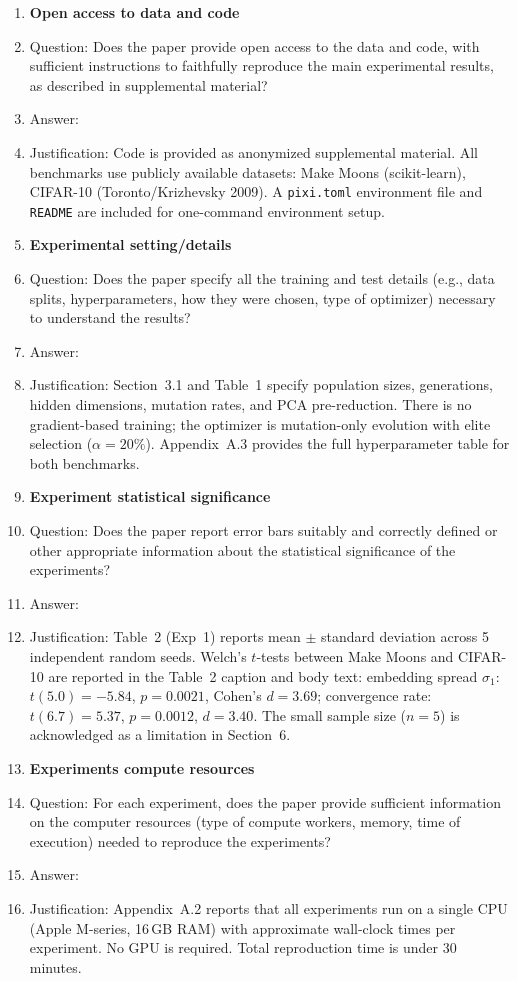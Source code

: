 \begin{enumerate}
\item {\bf Open access to data and code}
    \item[] Question: Does the paper provide open access to the data and code, with sufficient instructions to faithfully reproduce the main experimental results, as described in supplemental material?
    \item[] Answer: \answerYes{}
    \item[] Justification: Code is provided as anonymized supplemental material. All benchmarks use publicly available datasets: Make Moons (scikit-learn), CIFAR-10 (Toronto/Krizhevsky 2009). A \texttt{pixi.toml} environment file and \texttt{README} are included for one-command environment setup.

\item {\bf Experimental setting/details}
    \item[] Question: Does the paper specify all the training and test details (e.g., data splits, hyperparameters, how they were chosen, type of optimizer) necessary to understand the results?
    \item[] Answer: \answerYes{}
    \item[] Justification: Section~3.1 and Table~1 specify population sizes, generations, hidden dimensions, mutation rates, and PCA pre-reduction. There is no gradient-based training; the optimizer is mutation-only evolution with elite selection ($\alpha=20\%$). Appendix~A.3 provides the full hyperparameter table for both benchmarks.

\item {\bf Experiment statistical significance}
    \item[] Question: Does the paper report error bars suitably and correctly defined or other appropriate information about the statistical significance of the experiments?
    \item[] Answer: \answerYes{}
    \item[] Justification: Table~2 (Exp~1) reports mean $\pm$ standard deviation across 5 independent random seeds. Welch's $t$-tests between Make Moons and CIFAR-10 are reported in the Table~2 caption and body text: embedding spread $\sigma_1$: $t(5.0)=-5.84$, $p=0.0021$, Cohen's $d=3.69$; convergence rate: $t(6.7)=5.37$, $p=0.0012$, $d=3.40$. The small sample size ($n=5$) is acknowledged as a limitation in Section~6.

\item {\bf Experiments compute resources}
    \item[] Question: For each experiment, does the paper provide sufficient information on the computer resources (type of compute workers, memory, time of execution) needed to reproduce the experiments?
    \item[] Answer: \answerYes{}
    \item[] Justification: Appendix~A.2 reports that all experiments run on a single CPU (Apple M-series, 16\,GB RAM) with approximate wall-clock times per experiment. No GPU is required. Total reproduction time is under 30 minutes.


\end{enumerate}
